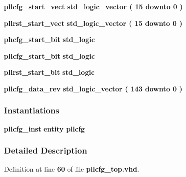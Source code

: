\begin{DoxyCompactItemize}
\item 
{\bf pllcfg\+\_\+start\+\_\+vect} {\bfseries \textcolor{comment}{std\+\_\+logic\+\_\+vector}\textcolor{vhdlchar}{ }\textcolor{vhdlchar}{(}\textcolor{vhdlchar}{ }\textcolor{vhdlchar}{ } \textcolor{vhdldigit}{15} \textcolor{vhdlchar}{ }\textcolor{keywordflow}{downto}\textcolor{vhdlchar}{ }\textcolor{vhdlchar}{ } \textcolor{vhdldigit}{0} \textcolor{vhdlchar}{ }\textcolor{vhdlchar}{)}\textcolor{vhdlchar}{ }} 
\item 
{\bf pllrst\+\_\+start\+\_\+vect} {\bfseries \textcolor{comment}{std\+\_\+logic\+\_\+vector}\textcolor{vhdlchar}{ }\textcolor{vhdlchar}{(}\textcolor{vhdlchar}{ }\textcolor{vhdlchar}{ } \textcolor{vhdldigit}{15} \textcolor{vhdlchar}{ }\textcolor{keywordflow}{downto}\textcolor{vhdlchar}{ }\textcolor{vhdlchar}{ } \textcolor{vhdldigit}{0} \textcolor{vhdlchar}{ }\textcolor{vhdlchar}{)}\textcolor{vhdlchar}{ }} 
\item 
{\bf phcfg\+\_\+start\+\_\+bit} {\bfseries \textcolor{comment}{std\+\_\+logic}\textcolor{vhdlchar}{ }} 
\item 
{\bf pllcfg\+\_\+start\+\_\+bit} {\bfseries \textcolor{comment}{std\+\_\+logic}\textcolor{vhdlchar}{ }} 
\item 
{\bf pllrst\+\_\+start\+\_\+bit} {\bfseries \textcolor{comment}{std\+\_\+logic}\textcolor{vhdlchar}{ }} 
\item 
{\bf pllcfg\+\_\+data\+\_\+rev} {\bfseries \textcolor{comment}{std\+\_\+logic\+\_\+vector}\textcolor{vhdlchar}{ }\textcolor{vhdlchar}{(}\textcolor{vhdlchar}{ }\textcolor{vhdlchar}{ } \textcolor{vhdldigit}{143} \textcolor{vhdlchar}{ }\textcolor{keywordflow}{downto}\textcolor{vhdlchar}{ }\textcolor{vhdlchar}{ } \textcolor{vhdldigit}{0} \textcolor{vhdlchar}{ }\textcolor{vhdlchar}{)}\textcolor{vhdlchar}{ }} 
\end{DoxyCompactItemize}
\subsubsection*{Instantiations}
 \begin{DoxyCompactItemize}
\item 
{\bf pllcfg\+\_\+inst}  {\bfseries entity pllcfg}   
\end{DoxyCompactItemize}


\subsubsection{Detailed Description}


Definition at line {\bf 60} of file {\bf pllcfg\+\_\+top.\+vhd}.



